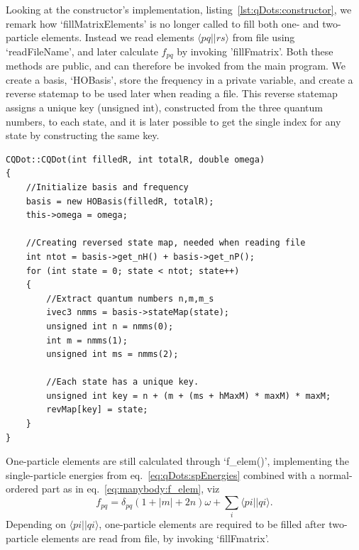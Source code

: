 Looking at the constructor's implementation, listing~\ref{lst:qDots:constructor}, we remark how `fillMatrixElements' is no longer called to fill both one- and two-particle elements. 
Instead we read elements $\langle pq||rs \rangle$ from file using `readFileName', and later calculate $f_{pq}$ by invoking 'fillFmatrix'. Both these methods are public, and can therefore be invoked from the main program.
We create a basis, `HOBasis', store the frequency in a private variable, and create a reverse statemap to be used later when reading a file.
This reverse statemap assigns a unique key (unsigned int), constructed from the three quantum numbers, to each state, and it is later possible to get the single index for any state by constructing the same key.
\begin{lstlisting}[float,label={lst:qDots:constructor},caption={Constructor for CQDot.}]
CQDot::CQDot(int filledR, int totalR, double omega)
{
    //Initialize basis and frequency
    basis = new HOBasis(filledR, totalR);
    this->omega = omega;

    //Creating reversed state map, needed when reading file
    int ntot = basis->get_nH() + basis->get_nP();
    for (int state = 0; state < ntot; state++)
    {
    	//Extract quantum numbers n,m,m_s
        ivec3 nmms = basis->stateMap(state);
        unsigned int n = nmms(0);
        int m = nmms(1);
        unsigned int ms = nmms(2);
        
        //Each state has a unique key.
        unsigned int key = n + (m + (ms + hMaxM) * maxM) * maxM;
        revMap[key] = state;
    }
}
\end{lstlisting}

One-particle elements are still calculated through `f\_elem()', implementing the single-particle energies from eq.~\eqref{eq:qDots:spEnergies} combined with a normal-ordered part as in eq.~\eqref{eq:manybody:f_elem}, viz
\begin{equation}
f_{pq} = \delta_{pq} \left(1 + |m| + 2n \right) \omega   + \sum_{i} \langle pi||qi \rangle .
\end{equation}
Depending on $\langle pi||qi \rangle$, one-particle elements are required to be filled after two-particle elements are read from file, by invoking `fillFmatrix'.


